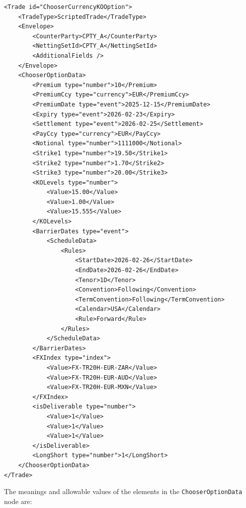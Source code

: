 \begin{listing}[H]
\begin{verbatim}
<Trade id="ChooserCurrencyKOOption">
	<TradeType>ScriptedTrade</TradeType>
	<Envelope>
		<CounterParty>CPTY_A</CounterParty>
		<NettingSetId>CPTY_A</NettingSetId>
		<AdditionalFields />
	</Envelope>
	<ChooserOptionData>
		<Premium type="number">10</Premium>
		<PremiumCcy type="currency">EUR</PremiumCcy>
		<PremiumDate type="event">2025-12-15</PremiumDate>
		<Expiry type="event">2026-02-23</Expiry>
		<Settlement type="event">2026-02-25</Settlement>
		<PayCcy type="currency">EUR</PayCcy>
		<Notional type="number">1111000</Notional>
		<Strike1 type="number">19.50</Strike1>
		<Strike2 type="number">1.70</Strike2>
		<Strike3 type="number">20.00</Strike3>
		<KOLevels type="number">
			<Value>15.00</Value>
			<Value>1.00</Value>
			<Value>15.555</Value>
		</KOLevels>
		<BarrierDates type="event">
			<ScheduleData>
				<Rules>
					<StartDate>2026-02-26</StartDate>
					<EndDate>2026-02-26</EndDate>
					<Tenor>1D</Tenor>
					<Convention>Following</Convention>
					<TermConvention>Following</TermConvention>
					<Calendar>USA</Calendar>
					<Rule>Forward</Rule>
				</Rules>
			</ScheduleData>
		</BarrierDates>
		<FXIndex type="index">
			<Value>FX-TR20H-EUR-ZAR</Value>
			<Value>FX-TR20H-EUR-AUD</Value>
			<Value>FX-TR20H-EUR-MXN</Value>
		</FXIndex>
		<isDeliverable type="number">
			<Value>1</Value>
			<Value>1</Value>
			<Value>1</Value>
		</isDeliverable>
		<LongShort type="number">1</LongShort>
	</ChooserOptionData>
</Trade>
\end{verbatim}
\caption{FX Chooser KO Option data (scripted representation)}
\label{lst:fxchooserkooption_data}
\end{listing}

The meanings and allowable values of the elements in the
\lstinline!ChooserOptionData! node are:

